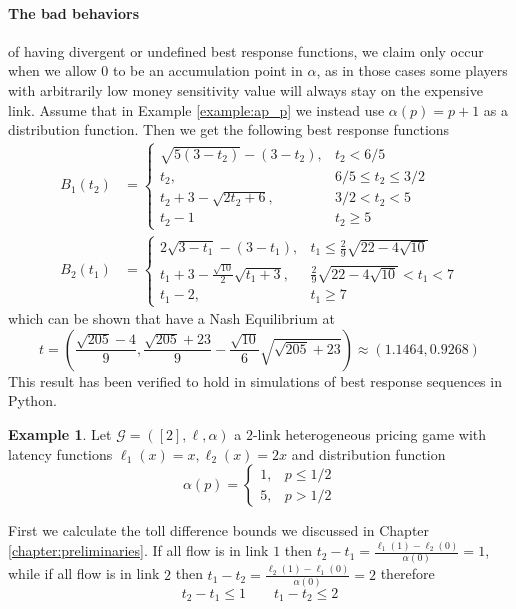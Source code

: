 \documentclass[10pt,a4paper]{book}
\newcommand{\Gm}{\mathcal{G}}
\theoremstyle{definition}
\theoremstyle{comment}
\newtheorem{example}[definition]{Example}
\begin{document}
\paragraph{The bad behaviors} of having divergent or undefined best response functions, we claim only occur when we allow $0$ to be an accumulation point in $\alpha$, as in those cases some players with arbitrarily low money sensitivity value will always stay on the expensive link.
Assume that in Example \ref{example:ap_p} we instead use $\alpha(p) = p + 1$ as a distribution function.
Then we get the following best response functions
\begin{align*}
	B_1(t_2) &=
	\begin{cases}
		\sqrt{5 (3 - t_2)} - (3 - t_2), & t_2 < 6/5 \\
		t_2, & 6/5 \le t_2 \le 3/2 \\
		t_2 + 3 - \sqrt{2 t_2 + 6}, & 3/2 < t_2 < 5 \\
		t_2 - 1 & t_2 \ge 5
	\end{cases} \\[10pt]
	B_2(t_1) &=
	\begin{cases}
		2 \sqrt{3 - t_1} - (3 - t_1), & t_1 \le \frac29 \sqrt{22 - 4 \sqrt{10}} \\
		t_1 + 3 - \frac{\sqrt{10}}2 \sqrt{t_1 + 3}, & \frac29 \sqrt{22 - 4 \sqrt{10}} < t_1 < 7 \\
		t_1 - 2, & t_1 \ge 7
	\end{cases}
\end{align*}
which can be shown that have a Nash Equilibrium at
\[t = \left(\frac{\sqrt{205} - 4}{9}, \frac{\sqrt{205} + 23}{9} - \frac{\sqrt{10}}{6} \sqrt{\sqrt{205} + 23}\right) \approx (1.1464, 0.9268)\]
This result has been verified to hold in simulations of best response sequences in Python.

\begin{example}
	Let $\Gm = ([2], \ell, \alpha)$ a $2$-link heterogeneous pricing game with latency functions $\ell_1(x) = x, \ell_2(x) = 2x$ and distribution function
	\[
		\alpha(p) =
		\begin{cases}
			1, & p \le 1/2 \\
			5, & p > 1/2
		\end{cases}
	\]
\end{example}

First we calculate the toll difference bounds we discussed in Chapter \ref{chapter:preliminaries}.
If all flow is in link $1$ then $t_2 - t_1 = \frac{\ell_1(1) - \ell_2(0)}{\alpha(0)} = 1$, while if all flow is in link $2$ then $t_1 - t_2 = \frac{\ell_2(1) - \ell_1(0)}{\alpha(0)} = 2$ therefore
\[t_2 - t_1 \le 1 \qquad t_1 - t_2 \le 2\]
\end{document}
